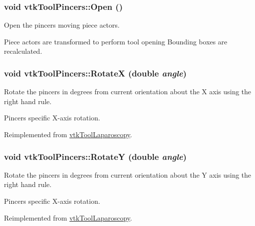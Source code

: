 \hypertarget{classvtkToolPincers_a0a0d2fdd1ac4ccc1823de3969a0aa45d}{
\subsubsection[{Open}]{\setlength{\rightskip}{0pt plus 5cm}void vtkToolPincers::Open ()}}
\label{classvtkToolPincers_a0a0d2fdd1ac4ccc1823de3969a0aa45d}


Open the pincers moving piece actors. 

Piece actors are transformed to perform tool opening Bounding boxes are recalculated. \hypertarget{classvtkToolPincers_ac6b80a0c7a43ae67cfafbe29772b41d0}{
\subsubsection[{RotateX}]{\setlength{\rightskip}{0pt plus 5cm}void vtkToolPincers::RotateX (double {\em angle})}}
\label{classvtkToolPincers_ac6b80a0c7a43ae67cfafbe29772b41d0}


Rotate the pincers in degrees from current orientation about the X axis using the right hand rule. 

Pincers specific X-\/axis rotation. 

Reimplemented from \hyperlink{classvtkToolLaparoscopy_a6894dddee203102828358697e8214974}{vtkToolLaparoscopy}.

\hypertarget{classvtkToolPincers_aa2a15405aa65c96dd971e3c06d98d197}{
\subsubsection[{RotateY}]{\setlength{\rightskip}{0pt plus 5cm}void vtkToolPincers::RotateY (double {\em angle})}}
\label{classvtkToolPincers_aa2a15405aa65c96dd971e3c06d98d197}


Rotate the pincers in degrees from current orientation about the Y axis using the right hand rule. 

Pincers specific X-\/axis rotation. 

Reimplemented from \hyperlink{classvtkToolLaparoscopy_ae0245eaa9aa765a675da5135c4af422a}{vtkToolLaparoscopy}.

